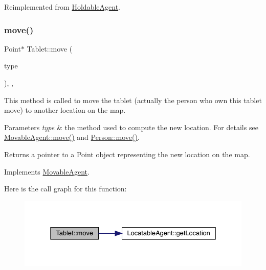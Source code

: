 Reimplemented from \mbox{\hyperlink{class_holdable_agent_ab330bb40de51a957ef8826af629f94a2}{Holdable\+Agent}}.

\mbox{\label{class_tablet_a0021a8d61f496d84540f675b1cb7d080}} 
\subsubsection{\texorpdfstring{move()}{move()}}
{\footnotesize\ttfamily Point$\ast$ Tablet\+::move (\begin{DoxyParamCaption}\item[{\mbox{\hyperlink{_movement_type_8h_a8a93b61bc797a7d1907f42796a252493}{Movement\+Type}}}]{type }\end{DoxyParamCaption})\hspace{0.3cm}{\ttfamily [inline]}, {\ttfamily [override]}, {\ttfamily [virtual]}}

This method is called to move the tablet (actually the person who own this tablet move) to another location on the map. 
\begin{DoxyParams}{Parameters}
{\em type} & the method used to compute the new location. For details see \mbox{\hyperlink{class_movable_agent_a35299e133c6787689b553d74ce5f98f0}{Movable\+Agent\+::move()}} and \mbox{\hyperlink{class_person_a89843e85f14abc08422273c20252ae23}{Person\+::move()}}. \\
\hline
\end{DoxyParams}
\begin{DoxyReturn}{Returns}
a pointer to a Point object representing the new location on the map. 
\end{DoxyReturn}


Implements \mbox{\hyperlink{class_movable_agent_a35299e133c6787689b553d74ce5f98f0}{Movable\+Agent}}.

Here is the call graph for this function\+:\nopagebreak
\begin{figure}[H]
\begin{center}
\leavevmode
\includegraphics[width=331pt]{class_tablet_a0021a8d61f496d84540f675b1cb7d080_cgraph}
\end{center}
\end{figure}
\mbox{\label{class_tablet_a3fae01e7d526699476221c6a686a4fba}} 
